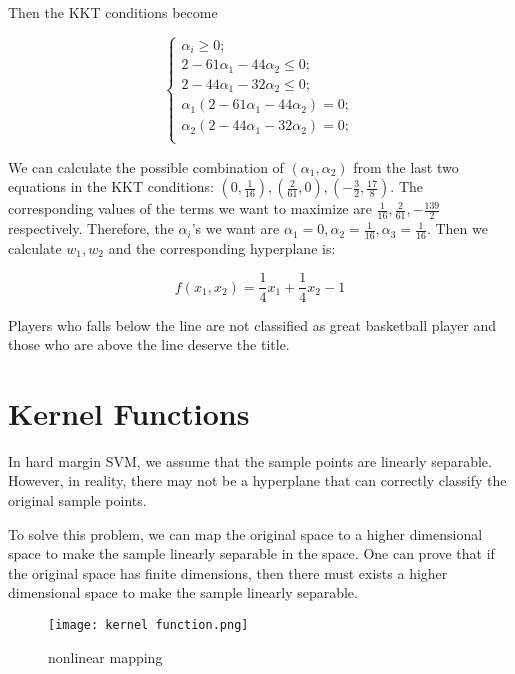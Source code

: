 \documentclass{article}
\begin{document}
Then the KKT conditions become

\begin{equation}
\begin{cases} \alpha_i \geq 0; \\ 
2-61\alpha_1-44\alpha_2 \leq 0; \\
2-44\alpha_1-32\alpha_2 \leq 0; \\
\alpha_1(2-61\alpha_1-44\alpha_2) = 0; \\
\alpha_2(2-44\alpha_1-32\alpha_2) = 0; \\
\end{cases}
\end{equation}

We can calculate the possible combination of $(\alpha_1, \alpha_2)$ from the last two equations in the KKT conditions: $(0,\frac{1}{16}),(\frac{2}{61},0),(-\frac{3}{2},\frac{17}{8})$. The corresponding values of the terms we want to maximize are $\frac{1}{16}, \frac{2}{61}, -\frac{139}{2}$ respectively. Therefore, the $\alpha_i$'s we want are $\alpha_1=0, \alpha_2 = \frac{1}{16}, \alpha_3 = \frac{1}{16}$. Then we calculate $w_1,w_2$ and the corresponding hyperplane is:

\begin{equation}
f(x_1,x_2) = \frac{1}{4}x_1 + \frac{1}{4}x_2 - 1
\end{equation}

Players who falls below the line are not classified as great basketball player and those who are above the line deserve the title.

\section{Kernel Functions}

In hard margin SVM, we assume that the sample points are linearly separable. However, in reality, there may not be a hyperplane that can correctly classify the original sample points.

To solve this problem, we can map the original space to a higher dimensional space to make the sample linearly separable in the space. One can prove that if the original space has finite dimensions, then there must exists a higher dimensional space to make the sample linearly separable.

\begin{figure}[H]
\centering
\texttt{[image: kernel function.png]}
\caption{nonlinear mapping}
\label{fig2}
\end{figure}
\end{document}

